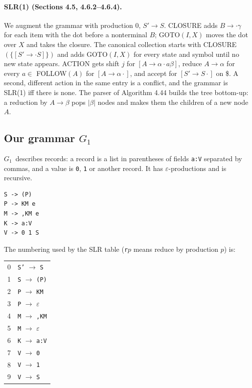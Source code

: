 \documentclass[11pt]{article}
\newcommand{\G}{\ensuremath{G_1}}
\begin{document}
\paragraph{SLR(1) (Sections 4.5, 4.6.2--4.6.4).}
We augment the grammar with production 0, $S' \to S$. CLOSURE adds
$B \to \cdot\gamma$ for each item with the dot before a nonterminal $B$;
GOTO$(I, X)$ moves the dot over $X$ and takes the closure. The canonical
collection starts with CLOSURE$(\{[S' \to \cdot S]\})$ and adds GOTO$(I, X)$
for every state and symbol until no new state appears. ACTION gets
shift $j$ for $[A \to \alpha \cdot a \beta]$, reduce $A \to \alpha$ for every
$a \in$ FOLLOW$(A)$ for $[A \to \alpha \cdot]$, and accept for
$[S' \to S \cdot]$ on \$. A second, different action in the same entry is a
conflict, and the grammar is SLR(1) iff there is none. The parser of
Algorithm 4.44 builds the tree bottom-up: a reduction by $A \to \beta$ pops
$|\beta|$ nodes and makes them the children of a new node $A$.

\subsection{Our grammar \G}

\G\ describes records: a record is a list in parentheses of fields
\texttt{a:V} separated by commas, and a value is \texttt{0}, \texttt{1} or
another record. It has $\varepsilon$-productions and is recursive.

\begin{verbatim}
S -> (P)
P -> KM e
M -> ,KM e
K -> a:V
V -> 0 1 S
\end{verbatim}

\noindent The numbering used by the SLR table (\texttt{r}$p$ means reduce by
production $p$) is:

\begin{center}\small
\begin{tabular}{rl}
0 & \texttt{S'} $\to$ \texttt{S} \\
1 & \texttt{S} $\to$ \texttt{(P)} \\
2 & \texttt{P} $\to$ \texttt{KM} \\
3 & \texttt{P} $\to$ $\varepsilon$ \\
4 & \texttt{M} $\to$ \texttt{,{}KM} \\
5 & \texttt{M} $\to$ $\varepsilon$ \\
6 & \texttt{K} $\to$ \texttt{a:V} \\
7 & \texttt{V} $\to$ \texttt{0} \\
8 & \texttt{V} $\to$ \texttt{1} \\
9 & \texttt{V} $\to$ \texttt{S}
\end{tabular}
\end{center}
\end{document}
